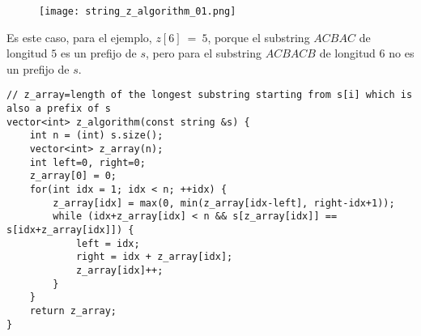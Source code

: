 \documentclass[10pt,letterpaper,twocolumn,twosided]{article}
\begin{document}

\begin{figure}
  \texttt{[image: string\_z\_algorithm\_01.png]}
\end{figure}

Es este caso, para el ejemplo, $z[6]\:=\:5$, porque el substring $ACBAC$ de longitud $5$ es un prefijo de $s$, pero para el substring $ACBACB$ de longitud $6$ no es un prefijo de $s$.

\begin{lstlisting}
// z_array=length of the longest substring starting from s[i] which is also a prefix of s
vector<int> z_algorithm(const string &s) {
    int n = (int) s.size();
    vector<int> z_array(n);
    int left=0, right=0;
    z_array[0] = 0;
    for(int idx = 1; idx < n; ++idx) {
        z_array[idx] = max(0, min(z_array[idx-left], right-idx+1));
        while (idx+z_array[idx] < n && s[z_array[idx]] == s[idx+z_array[idx]]) {
            left = idx;
            right = idx + z_array[idx];
            z_array[idx]++;
        }
    }
    return z_array;
}
\end{lstlisting}
\end{document}
